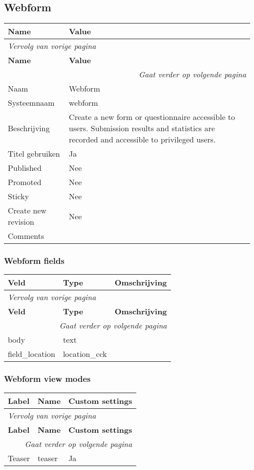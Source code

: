 \subsection{Webform}
\label{sec:content-webform}
  \begin{longtable}{| p{7.50cm}|p{7.50cm}|}
  \hline
  \rowcolor{tableheader}
  \textbf{Name} & \textbf{Value}  \tabularnewline
  \hline
\endfirsthead
\multicolumn{2}{l}{\textit{Vervolg van vorige pagina}} \\
\hline
\rowcolor{tableheader}
  \textbf{Name} & \textbf{Value}  \tabularnewline
  \hline
\hline
\endhead
\multicolumn{2}{r}{\textit{Gaat verder op volgende pagina}} \\
\endfoot
\hline
\endlastfoot
  Naam & Webform  \tabularnewline
  \hline
  Systeemnaam & webform  \tabularnewline
  \hline
  Beschrijving & Create a new form or questionnaire accessible to users. Submission results and statistics are recorded and accessible to privileged users.  \tabularnewline
  \hline
  Titel gebruiken & Ja  \tabularnewline
  \hline
  Published & Nee  \tabularnewline
  \hline
  Promoted & Nee  \tabularnewline
  \hline
  Sticky & Nee  \tabularnewline
  \hline
  Create new revision & Nee  \tabularnewline
  \hline
  Comments &   \tabularnewline
  \hline
  \end{longtable}

\subsubsection{Webform fields}
  \begin{longtable}{| p{5.00cm}|p{5.00cm}|p{5.00cm}|}
  \hline
  \rowcolor{tableheader}
  \textbf{Veld} & \textbf{Type} & \textbf{Omschrijving}  \tabularnewline
  \hline
\endfirsthead
\multicolumn{3}{l}{\textit{Vervolg van vorige pagina}} \\
\hline
\rowcolor{tableheader}
  \textbf{Veld} & \textbf{Type} & \textbf{Omschrijving}  \tabularnewline
  \hline
\hline
\endhead
\multicolumn{3}{r}{\textit{Gaat verder op volgende pagina}} \\
\endfoot
\hline
\endlastfoot
  body & text &   \tabularnewline
  \hline
  field\_location & location\_cck &   \tabularnewline
  \hline
  \end{longtable}

\subsubsection{Webform view modes}
  \begin{longtable}{| p{5.00cm}|p{5.00cm}|p{5.00cm}|}
  \hline
  \rowcolor{tableheader}
  \textbf{Label} & \textbf{Name} & \textbf{Custom settings}  \tabularnewline
  \hline
\endfirsthead
\multicolumn{3}{l}{\textit{Vervolg van vorige pagina}} \\
\hline
\rowcolor{tableheader}
  \textbf{Label} & \textbf{Name} & \textbf{Custom settings}  \tabularnewline
  \hline
\hline
\endhead
\multicolumn{3}{r}{\textit{Gaat verder op volgende pagina}} \\
\endfoot
\hline
\endlastfoot
  Teaser & teaser & Ja  \tabularnewline
  \hline
  \end{longtable}

